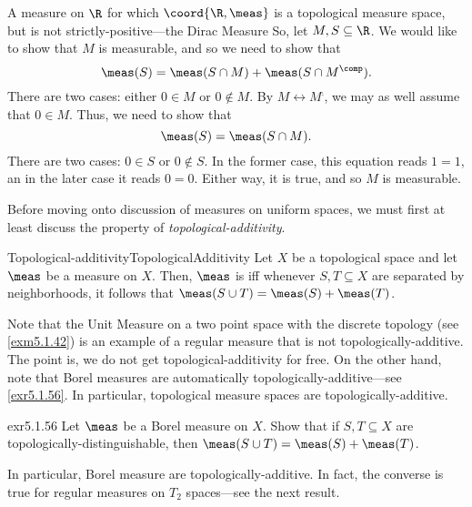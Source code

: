 \begin{exm}{A measure on $\R$ for which $\coord{\R ,\meas}$ is a topological measure space, but is not strictly-positive---the Dirac Measure}{}
So, let $M,S\subseteq \R$.  We would like to show that $M$ is measurable, and so we need to show that
\begin{equation}
\meas (S)=\meas (S\cap M)+\meas (S\cap M^{\comp}).
\end{equation}
There are two cases:  either $0\in M$ or $0\notin M$.  By $M\leftrightarrow M^{\comp}$, we may as well assume that $0\in M$.  Thus, we need to show that
\begin{equation}
\meas (S)=\meas (S\cap M).
\end{equation}
There are two cases:  $0\in S$ or $0\notin S$.  In the former case, this equation reads $1=1$, an in the later case it reads $0=0$.  Either way, it is true, and so $M$ is measurable.
\end{exm}

Before moving onto discussion of measures on uniform spaces, we must first at least discuss the property of \emph{topological-additivity}.
\begin{dfn}{Topological-additivity}{TopologicalAdditivity}
Let $X$ be a topological space and let $\meas$ be a measure on $X$.  Then, $\meas$ is  iff whenever $S,T\subseteq X$ are separated by neighborhoods, it follows that $\meas (S\cup T)=\meas (S)+\meas (T)$.
\begin{rmk}
Note that the Unit Measure on a two point space with the discrete topology (see \cref{exm5.1.42}) is an example of a regular measure that is not topologically-additive.  The point is, we do not get topological-additivity for free.  On the other hand, note that Borel measures are automatically topologically-additive---see \cref{exr5.1.56}.  In particular, topological measure spaces are topologically-additive.
\end{rmk}
\end{dfn}
\begin{exr}{}{exr5.1.56}
Let $\meas$ be a Borel measure on $X$.  Show that if $S,T\subseteq X$ are topologically-distinguishable, then $\meas (S\cup T)=\meas (S)+\meas (T)$.
\begin{rmk}
In particular, Borel measure are topologically-additive.  In fact, the converse is true for regular measures on $T_2$ spaces---see the next result.
\end{rmk}
\end{exr}
